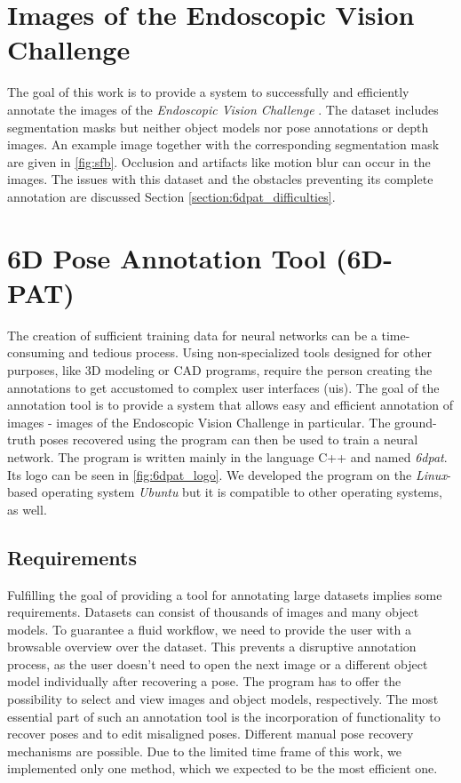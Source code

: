 \section{Images of the Endoscopic Vision Challenge}

The goal of this work is to provide a system to successfully and efficiently annotate the images of the \textit{Endoscopic Vision Challenge} \cite{endovis}. The dataset includes segmentation masks but neither object models nor pose annotations or depth images. An example image together with the corresponding segmentation mask are given in \fig \ref{fig:sfb}. Occlusion and artifacts like motion blur can occur in the images. The issues with this dataset and the obstacles preventing its complete annotation are discussed Section \ref{section:6dpat_difficulties}. 

\section{6D Pose Annotation Tool (6D-PAT)}

The creation of sufficient training data for neural networks can be a time-consuming and tedious process. Using non-specialized tools designed for other purposes, like 3D modeling or CAD programs, require the person creating the annotations to get accustomed to complex user interfaces (\acp{ui}). The goal of the annotation tool is to provide a system that allows easy and efficient annotation of images - images of the Endoscopic Vision Challenge in particular. The ground-truth poses recovered using the program can then be used to train a neural network. The program is written mainly in the language C++ and named \textit{\acf{6dpat}}. Its logo can be seen in \fig \ref{fig:6dpat_logo}. We developed the program on the \textit{Linux}-based operating system \textit{Ubuntu} but it is compatible to other operating systems, as well.

\subsection{Requirements}


Fulfilling the goal of providing a tool for annotating large datasets implies some requirements. Datasets can consist of thousands of images and many object models. To guarantee a fluid workflow, we need to provide the user with a browsable overview over the dataset. This prevents a disruptive annotation process, as the user doesn't need to open the next image or a different object model individually after recovering a pose. The program has to offer the possibility to select and view images and object models, respectively. The most essential part of such an annotation tool is the incorporation of functionality to recover poses and to edit misaligned poses. Different manual pose recovery mechanisms are possible. Due to the limited time frame of this work, we implemented only one method, which we expected to be the most efficient one.

